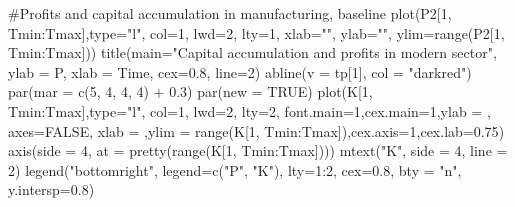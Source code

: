 \documentclass[
  letterpaper,
  DIV=11,
  numbers=noendperiod]{scrreprt}
\newenvironment{Shaded}{\begin{snugshade}}{\end{snugshade}}
\newcommand{\AttributeTok}[1]{\textcolor[rgb]{0.40,0.45,0.13}{#1}}
\newcommand{\CommentTok}[1]{\textcolor[rgb]{0.37,0.37,0.37}{#1}}
\newcommand{\ConstantTok}[1]{\textcolor[rgb]{0.56,0.35,0.01}{#1}}
\newcommand{\DecValTok}[1]{\textcolor[rgb]{0.68,0.00,0.00}{#1}}
\newcommand{\FloatTok}[1]{\textcolor[rgb]{0.68,0.00,0.00}{#1}}
\newcommand{\FunctionTok}[1]{\textcolor[rgb]{0.28,0.35,0.67}{#1}}
\newcommand{\NormalTok}[1]{\textcolor[rgb]{0.00,0.23,0.31}{#1}}
\newcommand{\SpecialCharTok}[1]{\textcolor[rgb]{0.37,0.37,0.37}{#1}}
\newcommand{\StringTok}[1]{\textcolor[rgb]{0.13,0.47,0.30}{#1}}
\begin{document}
\begin{Shaded}
\begin{Highlighting}[]
\CommentTok{\#Profits and capital accumulation in manufacturing, baseline}
\FunctionTok{plot}\NormalTok{(P2[}\DecValTok{1}\NormalTok{, Tmin}\SpecialCharTok{:}\NormalTok{Tmax],}\AttributeTok{type=}\StringTok{"l"}\NormalTok{, }\AttributeTok{col=}\DecValTok{1}\NormalTok{, }\AttributeTok{lwd=}\DecValTok{2}\NormalTok{, }\AttributeTok{lty=}\DecValTok{1}\NormalTok{, }\AttributeTok{xlab=}\StringTok{""}\NormalTok{, }\AttributeTok{ylab=}\StringTok{""}\NormalTok{, }\AttributeTok{ylim=}\FunctionTok{range}\NormalTok{(P2[}\DecValTok{1}\NormalTok{, Tmin}\SpecialCharTok{:}\NormalTok{Tmax])) }
\FunctionTok{title}\NormalTok{(}\AttributeTok{main=}\StringTok{"Capital accumulation and profits in modern sector"}\NormalTok{, }\AttributeTok{ylab =} \StringTok{\textquotesingle{}P\textquotesingle{}}\NormalTok{, }\AttributeTok{xlab =} \StringTok{\textquotesingle{}Time\textquotesingle{}}\NormalTok{, }\AttributeTok{cex=}\FloatTok{0.8}\NormalTok{, }\AttributeTok{line=}\DecValTok{2}\NormalTok{)}
\FunctionTok{abline}\NormalTok{(}\AttributeTok{v =}\NormalTok{ tp[}\DecValTok{1}\NormalTok{], }\AttributeTok{col =} \StringTok{"darkred"}\NormalTok{)}
\FunctionTok{par}\NormalTok{(}\AttributeTok{mar =} \FunctionTok{c}\NormalTok{(}\DecValTok{5}\NormalTok{, }\DecValTok{4}\NormalTok{, }\DecValTok{4}\NormalTok{, }\DecValTok{4}\NormalTok{) }\SpecialCharTok{+} \FloatTok{0.3}\NormalTok{)}
\FunctionTok{par}\NormalTok{(}\AttributeTok{new =} \ConstantTok{TRUE}\NormalTok{)}
\FunctionTok{plot}\NormalTok{(K[}\DecValTok{1}\NormalTok{, Tmin}\SpecialCharTok{:}\NormalTok{Tmax],}\AttributeTok{type=}\StringTok{"l"}\NormalTok{, }\AttributeTok{col=}\DecValTok{1}\NormalTok{, }\AttributeTok{lwd=}\DecValTok{2}\NormalTok{, }\AttributeTok{lty=}\DecValTok{2}\NormalTok{, }\AttributeTok{font.main=}\DecValTok{1}\NormalTok{,}\AttributeTok{cex.main=}\DecValTok{1}\NormalTok{,}\AttributeTok{ylab =} \StringTok{\textquotesingle{}\textquotesingle{}}\NormalTok{, }\AttributeTok{axes=}\ConstantTok{FALSE}\NormalTok{,}
     \AttributeTok{xlab =} \StringTok{\textquotesingle{}\textquotesingle{}}\NormalTok{,}\AttributeTok{ylim =} \FunctionTok{range}\NormalTok{(K[}\DecValTok{1}\NormalTok{, Tmin}\SpecialCharTok{:}\NormalTok{Tmax]),}\AttributeTok{cex.axis=}\DecValTok{1}\NormalTok{,}\AttributeTok{cex.lab=}\FloatTok{0.75}\NormalTok{)}
\FunctionTok{axis}\NormalTok{(}\AttributeTok{side =} \DecValTok{4}\NormalTok{, }\AttributeTok{at =} \FunctionTok{pretty}\NormalTok{(}\FunctionTok{range}\NormalTok{(K[}\DecValTok{1}\NormalTok{, Tmin}\SpecialCharTok{:}\NormalTok{Tmax])))  }
\FunctionTok{mtext}\NormalTok{(}\StringTok{"K"}\NormalTok{, }\AttributeTok{side =} \DecValTok{4}\NormalTok{, }\AttributeTok{line =} \DecValTok{2}\NormalTok{)}
\FunctionTok{legend}\NormalTok{(}\StringTok{"bottomright"}\NormalTok{, }\AttributeTok{legend=}\FunctionTok{c}\NormalTok{(}\StringTok{"P"}\NormalTok{, }\StringTok{"K"}\NormalTok{),}
       \AttributeTok{lty=}\DecValTok{1}\SpecialCharTok{:}\DecValTok{2}\NormalTok{, }\AttributeTok{cex=}\FloatTok{0.8}\NormalTok{, }\AttributeTok{bty =} \StringTok{"n"}\NormalTok{, }\AttributeTok{y.intersp=}\FloatTok{0.8}\NormalTok{)}
\end{Highlighting}
\end{Shaded}
\end{document}
